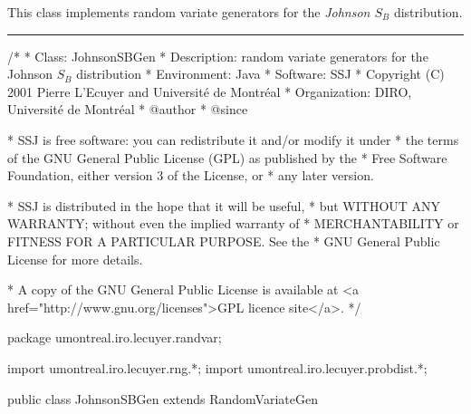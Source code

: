 
This class implements random variate generators for the 
{\em Johnson $S_B$\/} distribution. 


\bigskip\hrule

\begin{code}
\begin{hide}
/*
 * Class:        JohnsonSBGen
 * Description:  random variate generators for the Johnson $S_B$ distribution
 * Environment:  Java
 * Software:     SSJ 
 * Copyright (C) 2001  Pierre L'Ecuyer and Université de Montréal
 * Organization: DIRO, Université de Montréal
 * @author       
 * @since

 * SSJ is free software: you can redistribute it and/or modify it under
 * the terms of the GNU General Public License (GPL) as published by the
 * Free Software Foundation, either version 3 of the License, or
 * any later version.

 * SSJ is distributed in the hope that it will be useful,
 * but WITHOUT ANY WARRANTY; without even the implied warranty of
 * MERCHANTABILITY or FITNESS FOR A PARTICULAR PURPOSE.  See the
 * GNU General Public License for more details.

 * A copy of the GNU General Public License is available at
   <a href="http://www.gnu.org/licenses">GPL licence site</a>.
 */
\end{hide}
package umontreal.iro.lecuyer.randvar;\begin{hide}
import umontreal.iro.lecuyer.rng.*;
import umontreal.iro.lecuyer.probdist.*;
\end{hide}


public class JohnsonSBGen extends RandomVariateGen \begin{hide} {
   private double gamma;
   private double delta;
   private double xi;
   private double lambda;

\end{hide}\end{code}

